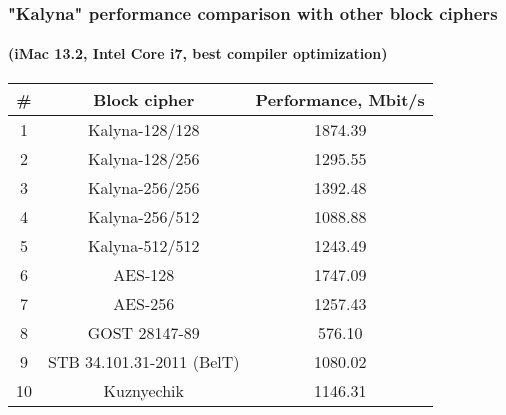 \documentclass[12pt,mathserif]{beamer}
\begin{document}
	\begin{frame}
		\frametitle {"Kalyna" performance comparison with other block ciphers}
		\framesubtitle{(iMac 13.2, Intel Core i7, best compiler optimization)}
		
		\begin{table}
			 \begin{center}
			  \begin{tabular}{ | c | c | c | }
			    \hline
			    \# & Block cipher & Performance, Mbit/s \\ \hline
			    1 & Kalyna-128/128 &	 1874.39 \\ \hline
				2 & Kalyna-128/256 &	 1295.55 \\ \hline
				3 & Kalyna-256/256 &	 1392.48 \\ \hline
				4 & Kalyna-256/512 &	 1088.88 \\ \hline
				5 & Kalyna-512/512 &	 1243.49 \\ \hline
				6 & AES-128 & 1747.09 \\ \hline
				7 & AES-256 & 1257.43 \\ \hline
				8 & GOST 28147-89 &	576.10 \\ \hline
				9 & STB 34.101.31-2011 (BelT) & 1080.02 \\ \hline
				10 & Kuznyechik & 1146.31 \\ \hline
			  \end{tabular}
			 \end{center} 
			\end{table}
		
	\end{frame}
	
\end{document}
